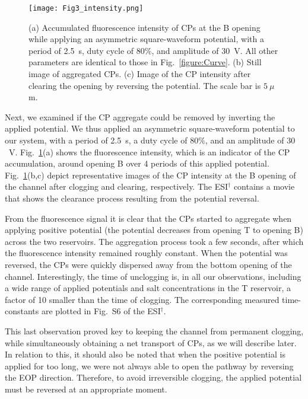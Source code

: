 \documentclass[twoside,twocolumn,9pt]{article}
\begin{document}
\begin{figure}[h]
 \centering\texttt{[image: Fig3\_intensity.png]}
 \caption{\label{figure:ACCurve}(a) Accumulated fluorescence intensity of CPs at the B opening while applying an asymmetric square-waveform potential, with a period of 2.5~s, duty cycle of $80\%$, and amplitude of 30~V. All other parameters are identical to those in Fig.~\ref{figure:Curve}. (b) Still image of aggregated CPs. (c) Image of the CP intensity after clearing the opening by reversing the potential. The scale bar is $5~\mu$m.}
\end{figure}

Next, we examined if the CP aggregate could be removed by inverting the applied potential.
We thus applied an asymmetric square-waveform potential to our system, with a period of 2.5~s, a duty cycle of $80\%$, and an amplitude of $30$~V. Fig.~\ref{figure:ACCurve}(a) shows the fluorescence intensity, which is an indicator of the CP accumulation, around opening B over 4 periods of this applied potential.
Fig.~\ref{figure:ACCurve}(b,c) depict representative images of the CP intensity at the B opening of the channel after clogging and clearing, respectively. The ESI$^{\dag}$ contains a movie that shows the clearance process resulting from the potential reversal.

From the fluorescence signal it is clear that the CPs started to aggregate when applying positive potential (the potential decreases from opening T to opening B) across the two reservoirs. 
The aggregation process took a few seconds, after which the fluorescence intensity remained roughly constant. 
When the potential was reversed, the CPs were quickly dispersed away from the bottom opening of the channel. 
Interestingly, the time of unclogging is, in all our observations, including a wide range of applied potentials and salt concentrations in the T reservoir, a factor of 10 smaller than the time of clogging.
The corresponding measured time-constants are plotted in Fig.~S6 of the ESI$^{\dag}$. 

This last observation proved key to keeping the channel from permanent clogging, while simultaneously obtaining a net transport of CPs, as we will describe later. 
In relation to this, it should also be noted that when the positive potential is applied for too long, we were not always able to open the pathway by reversing the EOP direction. 
Therefore, to avoid irreversible clogging, the applied potential must be reversed at an appropriate moment.
\end{document}
